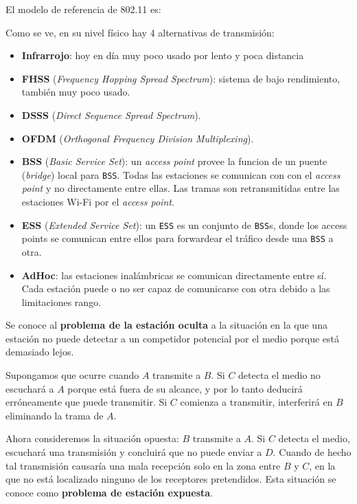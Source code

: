 \documentclass[]{article}
\begin{document}
El modelo de referencia de 802.11 es:

Como se ve, en su nivel físico hay 4 alternativas de transmisión:
\begin{itemize}
    \item \textbf{Infrarrojo}: hoy en día muy poco usado por lento y poca distancia %
    \item \textbf{FHSS} (\emph{Frequency Hopping Spread Spectrum}): sistema de bajo rendimiento, también muy poco usado.
    \item \textbf{DSSS} (\emph{Direct Sequence Spread Spectrum}).
    \item \textbf{OFDM} (\emph{Orthogonal Frequency Division Multiplexing}). %
\end{itemize}

\begin{itemize}
    \item \textbf{BSS} (\emph{Basic Service Set}): un \emph{access point} provee la funcion de un puente (\emph{bridge}) local para \texttt{BSS}. Todas las estaciones se comunican con con el \emph{access point} y no directamente entre ellas. Las tramas son retransmitidas entre las estaciones Wi-Fi por el \emph{access point}.
    \item \textbf{ESS} (\emph{Extended Service Set}): un \texttt{ESS} es un conjunto de \texttt{BSS}s, donde los access points se comunican entre ellos para forwardear el tráfico desde una \texttt{BSS} a otra.
    \item \textbf{AdHoc}: las estaciones inalámbricas se comunican directamente entre sí. Cada estación puede o no ser capaz de comunicarse con otra debido a las limitaciones rango.
\end{itemize}

Se conoce al \textbf{problema de la estación oculta} a la situación en la que una estación no puede detectar a un competidor potencial por el medio porque está demasiado lejos.

Supongamos que ocurre cuando $A$ transmite a $B$. Si $C$ detecta el medio no escuchará a $A$ porque está fuera de su alcance, y por lo tanto deducirá erróneamente que puede transmitir. Si $C$ comienza a transmitir, interferirá en $B$ eliminando la trama de $A$.


Ahora consideremos la situación opuesta: $B$ transmite a $A$. Si $C$ detecta el medio, escuchará una transmisión y concluirá que no puede enviar a $D$. Cuando de hecho tal transmisión causaría una mala recepción solo en la zona entre $B$ y $C$, en la que no está localizado ninguno de los receptores pretendidos. Esta situación se conoce como \textbf{problema de estación expuesta}.
\end{document}

